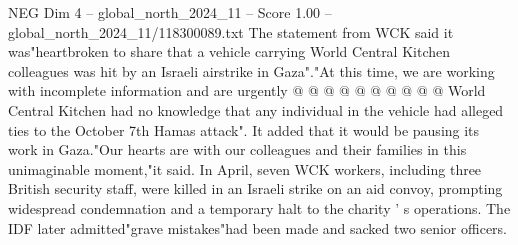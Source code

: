\begin{textsample}{NEG Dim 4 – global\_north\_2024\_11 – Score 1.00 – global\_north\_2024\_11/118300089.txt}
The statement from WCK said it was"heartbroken to share that a vehicle carrying World Central Kitchen colleagues was hit by an Israeli airstrike in Gaza"."At this time, we are working with incomplete information and are urgently @ @ @ @ @ @ @ @ @ @ World Central Kitchen had no knowledge that any individual in the vehicle had alleged ties to the October 7th Hamas attack".
It added that it would be pausing its work in Gaza."Our hearts are with our colleagues and their families in this unimaginable moment,"it said.
In April, seven WCK workers, including three British security staff, were killed in an Israeli strike on an aid convoy, prompting widespread condemnation and a temporary halt to the charity ' s operations.
The IDF later admitted"grave mistakes"had been made and sacked two senior officers.

\end{textsample}
